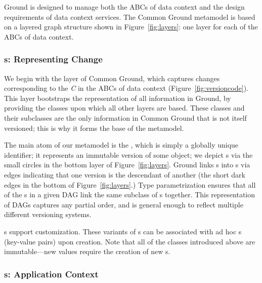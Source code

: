 \documentclass{sig-alternate}
\begin{document}
Ground is designed to manage both the ABCs of data context and the design requirements of data context services.
The Common Ground metamodel is based on a layered graph structure shown in Figure~\ref{fig:layers}: one layer for each of the ABCs of data context.

\subsubsection{{\VersionGraph}s: Representing Change}

We begin with the \versiongraph layer of Common Ground, which captures changes corresponding to the \emph{C} in the ABCs of data context (Figure~\ref{fig:versioncode}).
This layer bootstraps the representation of all information in Ground, by providing the classes upon which all other layers are based. These classes and their subclasses are the only information in Common Ground that is not itself versioned; this is why it forms the base of the metamodel.

The main atom of our metamodel is the \version, which is simply a globally unique identifier; it represents an immutable version of some object; we
depict \version{}s via the small circles in the bottom layer of Figure~\ref{fig:layers}. 
Ground links {\version}s into s via  edges
indicating that one version is the descendant of another (the short dark edges in the bottom of Figure~\ref{fig:layers}.)
Type parametrization ensures that all of the s in a given DAG link the same subclass of {\version}s together.
This representation of DAGs captures any partial order, and is general enough to reflect multiple different versioning systems.

s support customization. These variants of \version{}s can be associated with
ad hoc {\gtag}s (key-value pairs) upon creation. Note that all of the classes introduced above are immutable---new values require the creation of new \version{}s.

\subsubsection{{\ModelGraph}s: Application Context}
\end{document}
